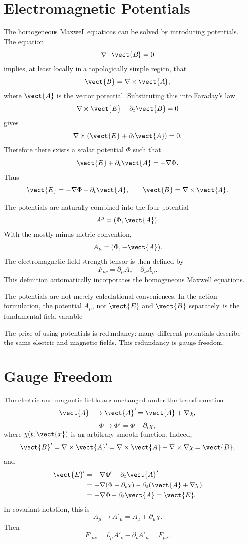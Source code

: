 \section{Electromagnetic Potentials}

The homogeneous Maxwell equations can be solved by introducing potentials. The
equation
\[
    \nabla\cdot\vect{B}=0
\]
implies, at least locally in a topologically simple region, that
\[
    \vect{B}=\nabla\times\vect{A},
\]
where \(\vect{A}\) is the vector potential. Substituting this into Faraday's law
\[
    \nabla\times\vect{E}+\partial_t\vect{B}=0
\]
gives
\[
    \nabla\times\left(\vect{E}+\partial_t\vect{A}\right)=0.
\]
Therefore there exists a scalar potential \(\Phi\) such that
\[
    \vect{E}+\partial_t\vect{A}=-\nabla\Phi.
\]
Thus
\[
    \vect{E}=-\nabla\Phi-\partial_t\vect{A},
    \qquad
    \vect{B}=\nabla\times\vect{A}.
\]

The potentials are naturally combined into the four-potential
\[
    A^\mu=(\Phi,\vect{A}).
\]
With the mostly-minus metric convention,
\[
    A_\mu=(\Phi,-\vect{A}).
\]
The electromagnetic field strength tensor is then defined by
\[
    F_{\mu\nu}=\partial_\mu A_\nu-\partial_\nu A_\mu.
\]
This definition automatically incorporates the homogeneous Maxwell equations.

\begin{remarkbox}
The potentials are not merely calculational conveniences. In the action
formulation, the potential \(A_\mu\), not \(\vect{E}\) and \(\vect{B}\)
separately, is the fundamental field variable.
\end{remarkbox}

The price of using potentials is redundancy: many different potentials describe
the same electric and magnetic fields. This redundancy is gauge freedom.

\section{Gauge Freedom}

The electric and magnetic fields are unchanged under the transformation
\[
    \vect{A}\longrightarrow \vect{A}'=\vect{A}+\nabla\chi,
\]
\[
    \Phi\longrightarrow \Phi'=\Phi-\partial_t\chi,
\]
where \(\chi(t,\vect{x})\) is an arbitrary smooth function. Indeed,
\[
    \vect{B}'=\nabla\times\vect{A}'
    =\nabla\times\vect{A}+\nabla\times\nabla\chi
    =\vect{B},
\]
and
\[
\begin{aligned}
    \vect{E}'
    &=-\nabla\Phi'-\partial_t\vect{A}' \\
    &=-\nabla(\Phi-\partial_t\chi)-\partial_t(\vect{A}+\nabla\chi) \\
    &=-\nabla\Phi-\partial_t\vect{A}
    =\vect{E}.
\end{aligned}
\]
In covariant notation, this is
\[
    A_\mu\longrightarrow A'_\mu=A_\mu+\partial_\mu\chi.
\]
Then
\[
    F'_{\mu\nu}=\partial_\mu A'_\nu-\partial_\nu A'_\mu=F_{\mu\nu}.
\]

